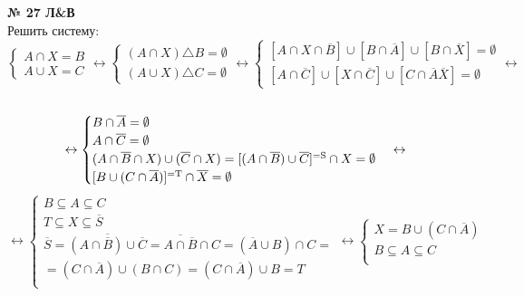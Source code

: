 \documentclass[12pt]{article}
\begin{document}
\vspace{.5cm}
{
	{\textbf{№ 27 Л\&В} \vspace{.5cm}\\}
	 Решить систему:
		\begin{equation*}
			\begin{cases}
				A \cap X = B\\
				A \cup X = C
			\end{cases} \leftrightarrow
			\begin{cases}
				(A \cap X) \triangle B = \emptyset\\
				(A \cup X) \triangle C = \emptyset
			\end{cases} \leftrightarrow
			\begin{cases}
				[A \cap X \cap \overline{B}] \cup [B \cap \overline{A}] \cup [B \cap \overline{X}] = \emptyset\\
				[A \cap \overline{C}] \cup [X \cap \overline{C}] \cup [C \cap \overline{A} \overline{X}] = \emptyset
			\end{cases} \leftrightarrow
		\end{equation*}\\
		\begin{equation*}
			\leftrightarrow
			\begin{cases}
				B \cap \overline{A} = \emptyset\\
				A \cap \overline{C} = \emptyset\\
				(A \cap \overline{B} \cap X) \cup (\overline{C} \cap X) = [(A \cap \overline{B}) \cup \overline{C}]^{\Large{\text{=S}}} \cap X = \emptyset\\
				[B \cup (C \cap \overline{A})]^{\Large{\text{=T}}} \cap \overline{X} = \emptyset\\
				
			\end{cases} \leftrightarrow
		\end{equation*}
		\begin{equation*}
		\leftrightarrow
		\begin{cases}
			B \subseteq A \subseteq C\\
			T \subseteq X \subseteq \overline{S}\\
			\overline{S} = \overline{(A \cap \overline{B}) \cup \overline{C}} = \overline{A \cap \overline{B}} \cap C = (\overline{A} \cup B) \cap C =\\= (C \cap \overline{A}) \cup (B \cap C) = (C \cap \overline{A}) \cup B = T\\
		\end{cases}
		\leftrightarrow
		\begin{cases}
			X = B \cup (C \cap \overline{A})\\
			B \subseteq A \subseteq C\\
		\end{cases}
		\end{equation*}\\
}
\end{document}
